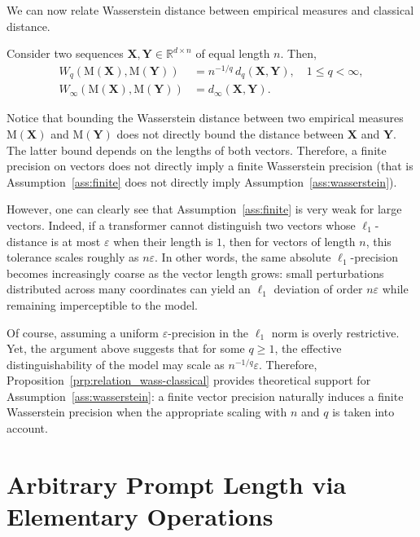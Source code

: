 We can now relate Wasserstein distance between empirical measures and classical distance.

\begin{proposition}\label{prp:relation_wass-classical}
     Consider two sequences $\mathbf{X},\mathbf{Y}\in \mathbb{R}^{d\times n}$ of equal length $n$. Then,
    \begin{align}
    W_q(\mathrm{M}(\mathbf{X}),\mathrm{M}(\mathbf{Y}))
    &= n^{-1/q}\, d_q(\mathbf{X},\mathbf{Y}), \quad 1\le q<\infty, \nonumber\\
    W_\infty(\mathrm{M}(\mathbf{X}),\mathrm{M}(\mathbf{Y}))
    &= d_\infty(\mathbf{X},\mathbf{Y}).\nonumber
    \end{align}
\end{proposition}

Notice that bounding the Wasserstein distance between two empirical measures $\mathrm M(\mathbf X)$ and $\mathrm M(\mathbf Y)$ does not directly bound the distance between $\mathbf X$ and $\mathbf Y$. The latter bound depends on the lengths of both vectors. Therefore, a finite precision on vectors does not directly imply a finite Wasserstein precision (that is Assumption~\ref{ass:finite} does not directly imply Assumption~\ref{ass:wasserstein}).

However, one can clearly see that Assumption~\ref{ass:finite} is very weak for large vectors. Indeed, if a transformer cannot distinguish two vectors whose $\ell_1$-distance is at most $\varepsilon$ when their length is $1$, then for vectors of length $n$, this tolerance scales roughly as $n\varepsilon$. In other words, the same absolute $\ell_1$-precision becomes increasingly coarse as the vector length grows: small perturbations distributed across many coordinates can yield an $\ell_1$ deviation of order $n\varepsilon$ while remaining imperceptible to the model.

Of course, assuming a uniform $\varepsilon$-precision in the $\ell_1$ norm is overly restrictive. Yet, the argument above suggests that for some $q\ge1$, the effective distinguishability of the model may scale as $n^{-1/q}\varepsilon$. Therefore, Proposition~\ref{prp:relation_wass-classical} provides theoretical support for Assumption~\ref{ass:wasserstein}: a finite vector precision naturally induces a finite Wasserstein precision when the appropriate scaling with $n$ and $q$ is taken into account.

\section{Arbitrary Prompt Length via Elementary Operations}\label{app:eo}

